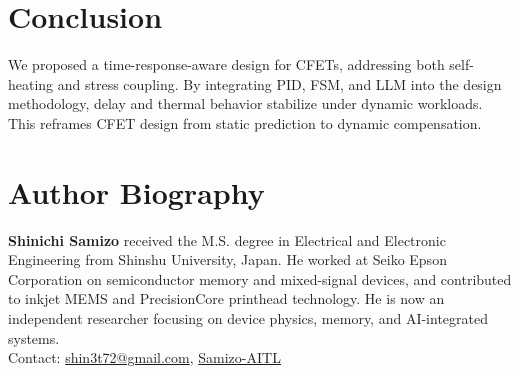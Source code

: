 \documentclass[conference]{IEEEtran}
\begin{document}
\section{Conclusion}
We proposed a time-response-aware design for CFETs, addressing both self-heating and stress coupling. By integrating PID, FSM, and LLM into the design methodology, delay and thermal behavior stabilize under dynamic workloads. This reframes CFET design from static prediction to dynamic compensation.




\section*{Author Biography}
\noindent\textbf{Shinichi Samizo} received the M.S. degree in Electrical and Electronic Engineering from Shinshu University, Japan. He worked at Seiko Epson Corporation on semiconductor memory and mixed-signal devices, and contributed to inkjet MEMS and PrecisionCore printhead technology. He is now an independent researcher focusing on device physics, memory, and AI-integrated systems.\\
Contact: \href{mailto:shin3t72@gmail.com}{shin3t72@gmail.com}, \href{https://github.com/Samizo-AITL}{Samizo-AITL}
\end{document}
